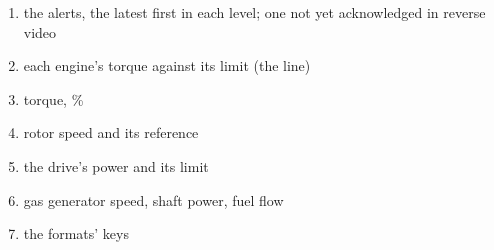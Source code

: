 \begin{enumerate}[label=\textbf{\arabic*},leftmargin=*,itemsep=0pt]
\item the alerts, the latest first in each level; one not yet acknowledged in reverse video
\item each engine's torque against its limit (the line)
\item torque, \%
\item rotor speed and its reference
\item the drive's power and its limit
\item gas generator speed, shaft power, fuel flow
\item the formats' keys
\end{enumerate}
